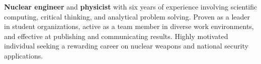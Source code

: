 

\normalsize
\begin{justify}
\textbf{Nuclear engineer} and \textbf{physicist} with six years of experience involving scientific computing, critical thinking, and analytical problem solving.
Proven as a leader in student organizations, active as a team member in diverse work environments, and effective at publishing and communicating results.
Highly motivated individual seeking a rewarding career on nuclear weapons and national security applications.
\end{justify}

